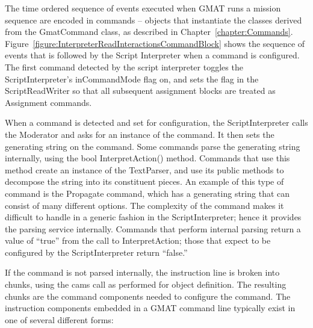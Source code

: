 The time ordered sequence of events executed when GMAT runs a mission sequence are encoded in
commands -- objects that instantiate the classes derived from the GmatCommand class, as described
in Chapter~\ref{chapter:Commands}.  Figure~\ref{figure:InterpreterReadInteractionsCommandBlock}
shows the sequence of events that is followed by the Script Interpreter when a command is
configured.  The first command detected by the script interpreter toggles the ScriptInterpreter's
inCommandMode flag on, and sets the flag in the ScriptReadWriter so that all subsequent assignment
blocks are treated as Assignment commands.

When a command is detected and set for configuration, the ScriptInterpreter calls the Moderator
and asks for an instance of the command.  It then sets the generating string on the command.  Some
commands parse the generating string internally, using the bool InterpretAction() method.  Commands
that use this method create an instance of the TextParser, and use its public methods to decompose
the string into its constituent pieces.  An example of this type of command is the Propagate
command, which has a generating string that can consist of many different options.  The complexity
of the command makes it difficult to handle in a generic fashion in the ScriptInterpreter; hence it
provides the parsing service internally.  Commands that perform internal parsing return a value of
``true'' from the call to InterpretAction; those that expect to be configured by the
ScriptInterpreter return ``false.''

If the command is not parsed internally, the instruction line is broken into chunks, using the
cams call as performed for object definition.  The resulting chunks are the command components
needed to configure the command.  The instruction components embedded in a GMAT command line
typically exist in one of several different forms:

